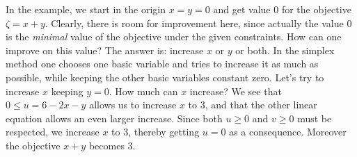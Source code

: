 \documentclass[ukenglish]{nik}
\begin{document}
In the example, we start in the origin $x=y=0$ and get
value 0 for the objective $\zeta = x + y$.
Clearly, there is room for improvement here, since actually 
the value 0 is the \emph{minimal} value of the objective
under the given constraints. How can one improve on this
value? The answer is: increase $x$ or $y$ or both.
In the simplex method one chooses one basic variable and
tries to increase it as much as possible, while keeping the
other basic variables constant zero.
Let's try to increase $x$ keeping $y=0$. How much can $x$ increase?
We see that $0 \leq u = 6 -2x-y$ allows us to increase $x$ to $3$,
and that the other linear equation allows an even larger increase. Since both
$u\geq 0$ and $v\geq 0$ must be respected, we increase $x$ to $3$,
thereby getting $u=0$ as a consequence. Moreover the objective $x+y$ becomes 3.
\end{document}
